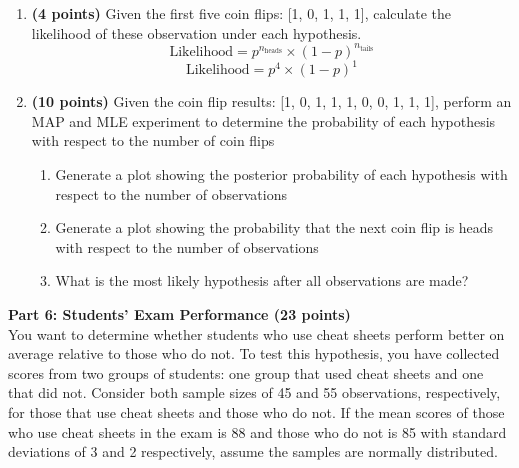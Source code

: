 \documentclass[a3paper,12pt]{extarticle} %
\begin{document}
    \begin{enumerate}
        \item \textbf{(4 points)} Given the first five coin flips: [1, 0, 1, 1, 1], calculate the likelihood of these observation
        under each hypothesis.
        \[
        \text{Likelihood} = p^{n_{\text{heads}}} \times (1-p)^{n_{\text{tails}}}
        \]
        \[
        \text{Likelihood} = p^{4} \times (1-p)^{1}
        \]
        \item \textbf{(10 points)} Given the coin flip results: [1, 0, 1, 1, 1, 0, 0, 1, 1, 1], perform an MAP and MLE experiment
        to determine the probability of each hypothesis with respect to the number of coin flips
        \begin{enumerate}
            \item Generate a plot showing the posterior probability of each hypothesis with respect to the
            number of observations
            \item Generate a plot showing the probability that the next coin flip is heads with respect to the
            number of observations
            \item What is the most likely hypothesis after all observations are made?
        \end{enumerate}
    \end{enumerate}
    \subitem \textbf{Part 6: Students’ Exam Performance (23 points)}
   \\ You want to determine whether students who use cheat sheets perform better on average relative to
those who do not. To test this hypothesis, you have collected scores from two groups of students: one
group that used cheat sheets and one that did not. Consider both sample sizes of 45 and 55 observations,
respectively, for those that use cheat sheets and those who do not. If the mean scores of those who use
cheat sheets in the exam is 88 and those who do not is 85 with standard deviations of 3 and 2 respectively,
assume the samples are normally distributed.
\end{document}
